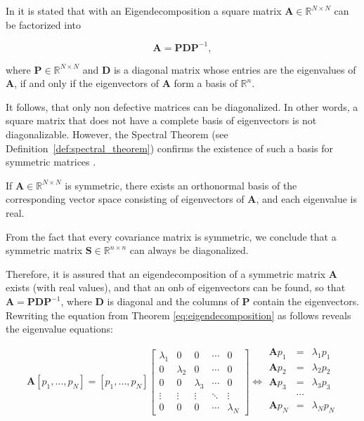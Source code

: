 \documentclass[../../../main.tex]{subfiles}
\begin{document}
In \cite[99]{dei_2020} it is stated that with an Eigendecomposition a square matrix $\bm{A} \in \mathbb{R}^{N \times N}$ can be factorized into

\begin{equation}\label{eq:eigendecomposition}
    \bm{A} = \bm{P}\bm{D}\bm{P}^{-1},
\end{equation}

where $\bm{P} \in \mathbb{R}^{N \times N}$ and $\bm{D}$ is a diagonal matrix whose entries are the eigenvalues of $\bm{A}$, if and only if the eigenvectors of $\bm{A}$ form a basis of $\mathbb{R}^n$.

It follows, that only non defective matrices can be diagonalized. In other words, a square matrix that does not have a complete basis of eigenvectors is not diagonalizable. However, the Spectral Theorem (see Definition~\ref{def:spectral_theorem}) confirms the existence of such a basis for symmetric matrices \cite[94]{dei_2020}.

\begin{definition}\label{def:spectral_theorem}
If $\bm{A} \in \mathbb{R}^{N \times N}$ is symmetric, there exists an orthonormal basis of the corresponding vector space consisting of eigenvectors of $\bm{A}$, and each eigenvalue is real.
\end{definition}

From the fact that every covariance matrix is symmetric, we conclude that a symmetric matrix $\bm{S} \in \mathbb{R}^{n \times n}$ can always be diagonalized.

Therefore, it is assured that an eigendecomposition of a symmetric matrix $\bm{A}$ exists (with real values), and that an \acrshort{onb} of eigenvectors can be found, so that $\bm{A} = \bm{P}\bm{D}\bm{P}^{-1}$, where $\bm{D}$ is diagonal and the columns of $\bm{P}$ contain the eigenvectors. Rewriting the equation from Theorem \ref{eq:eigendecomposition} as follows reveals the eigenvalue equations:

\begin{equation*}
        \bm{A} [p_1, \dots, p_N] = [p_1, \dots, p_N] \left[\begin{array}{ccccc}
            \lambda_1 & 0 & 0 & \cdots & 0 \\
            0 & \lambda_2 & 0 & \cdots & 0 \\
            0 & 0 & \lambda_3 & \cdots & 0 \\
            \vdots & \vdots & \vdots & \ddots & \vdots \\
            0 & 0 & 0 & \cdots & \lambda_N
        \end{array}\right] \Longleftrightarrow \begin{array}{ccc} 
            \bm{A}p_1 &= &\lambda_1p_1\\
            \bm{A}p_2 &= &\lambda_2p_2\\
            \bm{A}p_3 &= &\lambda_3p_3\\
            & \cdots& \\
            \bm{A}p_N &= &\lambda_Np_N\\
        \end{array}
\end{equation*}
\end{document}
